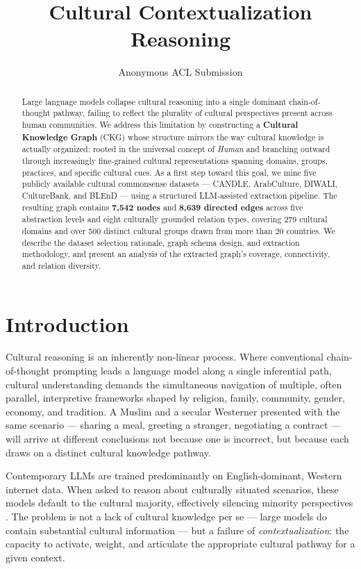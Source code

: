 \documentclass[11pt]{article}
\title{Cultural Contextualization Reasoning}
\author{Anonymous ACL Submission}
\begin{document}
\maketitle

\begin{abstract}
Large language models collapse cultural reasoning into a single dominant
chain-of-thought pathway, failing to reflect the plurality of cultural
perspectives present across human communities.
We address this limitation by constructing a \textbf{Cultural Knowledge
Graph} (CKG) whose structure mirrors the way cultural knowledge is
actually organized: rooted in the universal concept of \emph{Human} and
branching outward through increasingly fine-grained cultural
representations spanning domains, groups, practices, and specific
cultural cues.
As a first step toward this goal, we mine five publicly available cultural
commonsense datasets — CANDLE, ArabCulture, DIWALI, CultureBank, and
BLEnD — using a structured LLM-assisted extraction pipeline.
The resulting graph contains \textbf{7,542 nodes} and \textbf{8,639
directed edges} across five abstraction levels and eight culturally
grounded relation types, covering 279 cultural domains and over
500 distinct cultural groups drawn from more than 20 countries.
We describe the dataset selection rationale, graph schema design, and
extraction methodology, and present an analysis of the extracted graph's
coverage, connectivity, and relation diversity.
\end{abstract}

\section{Introduction}

Cultural reasoning is an inherently non-linear process.
Where conventional chain-of-thought prompting leads a language model
along a single inferential path, cultural understanding demands the
simultaneous navigation of multiple, often parallel, interpretive
frameworks shaped by religion, family, community, gender, economy, and
tradition.
A Muslim and a secular Westerner presented with the same scenario —
sharing a meal, greeting a stranger, negotiating a contract — will arrive
at different conclusions not because one is incorrect, but because each
draws on a distinct cultural knowledge pathway.

Contemporary LLMs are trained predominantly on English-dominant, Western
internet data.
When asked to reason about culturally situated scenarios, these models
default to the cultural majority, effectively silencing minority
perspectives \cite{myung2024blend,shi2024culturebank}.
The problem is not a lack of cultural knowledge per se — large models do
contain substantial cultural information — but a failure of
\emph{contextualization}: the capacity to activate, weight, and
articulate the appropriate cultural pathway for a given context.
\end{document}
